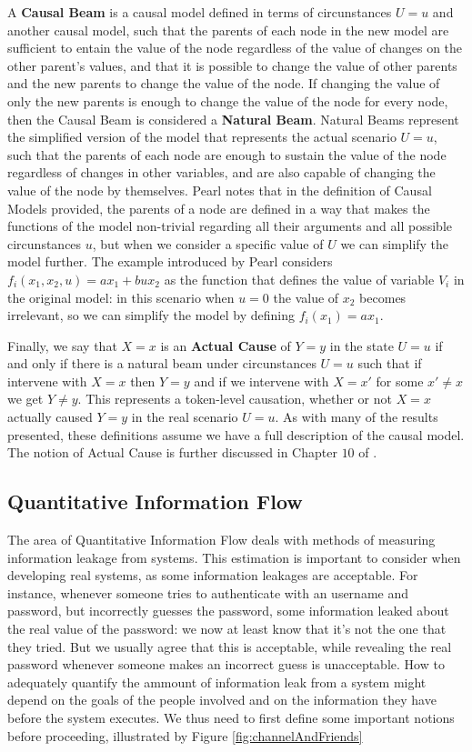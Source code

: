 A \textbf{Causal Beam} is a causal model defined in terms of circunstances $U=u$ and another causal model, such that the parents of each node in the new model are sufficient to entain the value of the node regardless of the value of changes on the other parent's values, and that it is possible to change the value of other parents and the new parents to change the value of the node. If changing the value of only the new parents is enough to change the value of the node for every node, then the Causal Beam is considered a \textbf{Natural Beam}. Natural Beams represent the simplified version of the model that represents the actual scenario $U=u$, such that the parents of each node are enough to sustain the value of the node regardless of changes in other variables, and are also capable of changing the value of the node by themselves. Pearl notes that in the definition of Causal Models provided, the parents of a node are defined in a way that makes the functions of the model non-trivial regarding all their arguments and all possible circunstances $u$, but when we consider a specific value of $U$ we can simplify the model further. The example introduced by Pearl considers $f_i(x_1,x_2,u) = ax_1+bux_2$ as the function that defines the value of variable $V_i$ in the original model: in this scenario when $u=0$ the value of $x_2$ becomes irrelevant, so we can simplify the model by defining $f_i(x_1) = ax_1$. 

Finally, we say that $X=x$ is an \textbf{Actual Cause} of $Y=y$ in the state $U=u$ if and only if there is a natural beam under circunstances $U=u$ such that if intervene with $X=x$ then $Y=y$ and if we intervene with $X=x'$ for some $x'\neq x$ we get $Y \neq y$. This represents a token-level causation, whether or not $X=x$ actually caused $Y=y$ in the real scenario $U=u$. As with many of the results presented, these definitions assume we have a full description of the causal model. The notion of Actual Cause is further discussed in Chapter $10$ of \cite{Causality}.


\subsection{Quantitative Information Flow}

The area of Quantitative Information Flow deals with methods of measuring information leakage from systems. This estimation is important to consider when developing real systems, as some information leakages are acceptable. For instance, whenever someone tries to authenticate with an username and password, but incorrectly guesses the password, some information leaked about the real value of the password: we now at least know that it's not the one that they tried. But we usually agree that this is acceptable, while revealing the real password whenever someone makes an incorrect guess is unacceptable. How to adequately quantify the ammount of information leak from a system might depend on the goals of the people involved and on the information they have before the system executes. We thus need to first define some important notions before proceeding, illustrated by Figure \ref{fig:channelAndFriends}

